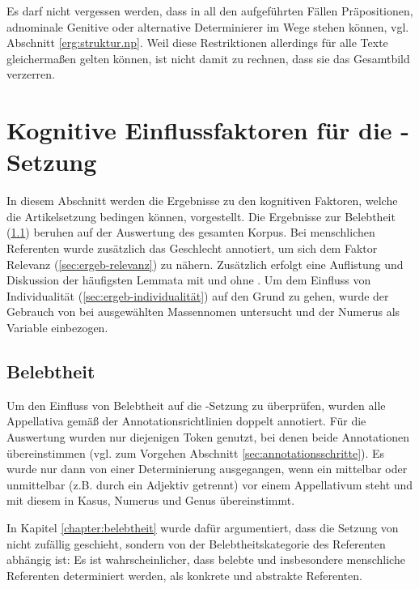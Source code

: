 Es darf nicht vergessen werden, dass in all den aufgeführten Fällen Präpositionen,  adnominale Genitive oder alternative Determinierer  im Wege stehen können, vgl. Abschnitt \ref{erg:struktur.np}. Weil diese Restriktionen allerdings für alle Texte gleichermaßen gelten können, ist nicht damit zu rechnen, dass sie das Gesamtbild verzerren.  


\section{Kognitive Einflussfaktoren für die -Setzung} \label{sec:ergeb-faktoren}

In diesem Abschnitt werden die Ergebnisse zu den kognitiven Faktoren, welche die Artikelsetzung bedingen können, vorgestellt. Die Ergebnisse zur Belebtheit (\ref{sec:ergeb-belebtheit}) beruhen auf der Auswertung des gesamten Korpus. Bei menschlichen Referenten wurde zusätzlich das Geschlecht annotiert, um sich dem Faktor Relevanz (\ref{sec:ergeb-relevanz}) zu nähern. Zusätzlich erfolgt eine Auflistung und Diskussion der häufigsten Lemmata mit und ohne . Um dem Einfluss von Individualität (\ref{sec:ergeb-individualität}) auf den Grund zu gehen, wurde der Gebrauch von  bei ausgewählten Massennomen untersucht und der Numerus als Variable einbezogen.  
    
\subsection{Belebtheit}\label{sec:ergeb-belebtheit}

Um den Einfluss von Belebtheit auf die -Setzung zu überprüfen, wurden alle Appellativa gemäß der Annotationsrichtlinien  doppelt annotiert. Für die Auswertung wurden nur diejenigen Token genutzt, bei denen beide Annotationen übereinstimmen (vgl. zum Vorgehen Abschnitt \ref{sec:annotationsschritte}). Es wurde nur dann von einer Determinierung ausgegangen, wenn ein  mittelbar oder unmittelbar (z.B. durch ein Adjektiv getrennt) vor einem Appellativum steht und mit diesem in Kasus, Numerus und Genus  übereinstimmt.    


In Kapitel \ref{chapter:belebtheit} wurde dafür argumentiert, dass die Setzung von  nicht zufällig geschieht, sondern von der Belebtheitskategorie des Referenten abhängig ist: Es ist wahrscheinlicher, dass belebte und insbesondere menschliche Referenten determiniert werden, als konkrete und abstrakte Referenten.

